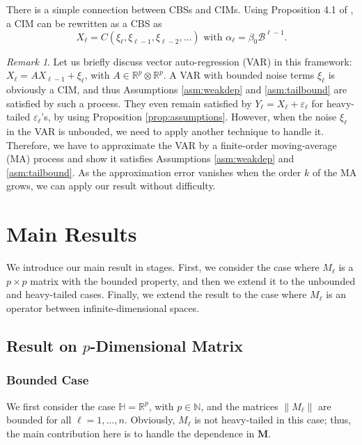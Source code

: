 \documentclass[11pt,a4paper]{article}
\theoremstyle{remark}
\newtheorem{remark}{Remark}
\theoremstyle{definition}
\theoremstyle{definition}
\begin{document}
\begin{bibunit}[apalike]
There is a simple connection between CBSs and CIMs.
Using Proposition 4.1 of \citep{alquier2012model}, a CIM can be rewritten as a CBS as
$$ X_\ell = C(\xi_{\ell},\xi_{\ell-1},\xi_{\ell-2},\dots) \text{ with } \alpha_\ell = \beta_0 \mathcal{B}^{\ell-1}.$$


\begin{remark}
Let us briefly discuss vector auto-regression (VAR) in this framework: $X_{\ell} = A X_{\ell - 1} + \xi_\ell$, with $A \in \mathbb{R}^{p} \otimes \mathbb{R}^{p}$.
A VAR with bounded noise terms $\xi_\ell$ is obviously a CIM, and thus Assumptions \ref{asm:weakdep} and \ref{asm:tailbound} are satisfied by such a process. They even remain satisfied by $Y_\ell = X_\ell +\varepsilon_\ell  $ for heavy-tailed $\varepsilon_\ell$'s, by using Proposition \ref{prop:assumptions}. 
However, when the noise $\xi_\ell$ in the VAR is unbouded, we need to apply another technique to handle it.
Therefore, we have to approximate the VAR by a finite-order moving-average (MA) process and show it satisfies Assumptions \ref{asm:weakdep} and \ref{asm:tailbound}.
As the approximation error vanishes when the order $k$ of the MA grows, we can apply our result without difficulty.
\end{remark}


\section{Main Results} \label{sec:result}

We introduce our main result in stages. 
First, we consider the case where $M_\ell$ is a $p \times p$ matrix with the bounded property, and then we extend it to the unbounded and heavy-tailed cases. 
Finally, we extend the result to the case where $M_\ell$ is an operator between infinite-dimensional spaces.


\subsection{Result on $p$-Dimensional Matrix}

\subsubsection{Bounded Case}

We first consider the case $\mathbb{H} = \mathbb{R}^p$, with $p \in \mathbb{N}$, and the matrices $\|M_\ell\|$ are bounded for all $ \ell = 1,\ldots,n$.
Obviously, $M_\ell$ is not heavy-tailed in this case; thus, the main contribution here is to handle the dependence in $\mathbf{M}$.



\end{bibunit}
\end{document}
